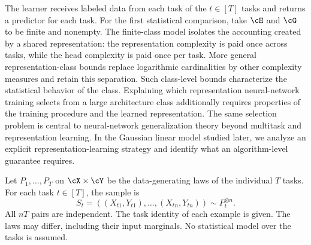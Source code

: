 \documentclass[11pt,twoside]{article}
\theoremstyle{definition}
\theoremstyle{remark}
\begin{document}
The learner receives labeled data from each task of the $t\in [T]$ tasks
and returns a predictor for
each task. For the first statistical comparison, take $\cH$ and $\cG$ to be
finite and nonempty. The finite-class model isolates the accounting created
by a shared representation: the representation complexity is paid once
across tasks, while the head complexity is paid once per task. More general
representation-class bounds replace logarithmic cardinalities by other
complexity measures and retain this separation.
Such class-level bounds characterize the statistical behavior of the class.
Explaining which representation neural-network training selects from a large
architecture class additionally requires properties of the training procedure
and the learned representation. The same selection problem is central to
neural-network generalization theory beyond multitask and representation
learning.
In the Gaussian linear model studied later,
we analyze an explicit representation-learning strategy
and identify what an algorithm-level guarantee requires.

Let  $P_1,\ldots,P_T$ on $\cX\times\cY$ be the data-generating laws of the
individual $T$ tasks.
For each task $t\in [T]$, the sample is
\[
 S_t=((X_{t1},Y_{t1}),\ldots,(X_{tn},Y_{tn}))\sim P_t^{\otimes n}.
\]
All $nT$ pairs are independent.
The task identity of each example is given.
The laws may differ, including their input marginals.
No statistical model over the tasks is assumed.
\end{document}
